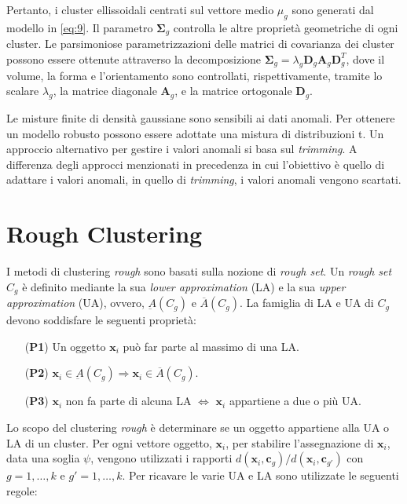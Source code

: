 \documentclass[12pt]{article}
\begin{document}
Pertanto, i cluster ellissoidali centrati sul vettore medio $\mu_g$ sono generati dal modello in \eqref{eq:9}. Il parametro $\boldsymbol{\Sigma}_g$ controlla le altre proprietà geometriche di ogni cluster. Le parsimoniose parametrizzazioni delle matrici di covarianza dei cluster possono essere ottenute attraverso la decomposizione $\boldsymbol{\Sigma}_g = \lambda_g \mathbf{D}_g \mathbf{A}_g \mathbf{D}_g^T$, dove il volume, la forma e l'orientamento sono controllati, rispettivamente, tramite lo scalare $\lambda_g$, la matrice diagonale $\mathbf{A}_g$, e la matrice ortogonale $\mathbf{D}_g$.

Le misture finite di densità gaussiane sono sensibili ai dati anomali. Per ottenere un modello robusto possono essere adottate una mistura di distribuzioni t. Un approccio alternativo per gestire i valori anomali si basa sul \textit{trimming}. A differenza degli approcci menzionati in precedenza in cui l'obiettivo è quello di adattare i valori anomali, in quello di \textit{trimming}, i valori anomali vengono scartati.

\section{Rough Clustering}

I metodi di clustering \textit{rough} sono basati sulla nozione di \textit{rough set}. Un \textit{rough set} $C_g$ è definito mediante la sua \textit{lower approximation} (LA) e la sua \textit{upper approximation} (UA), ovvero, $\underbar{A}(C_g)$ e $\overline{A}(C_g)$. La famiglia di LA e UA di $C_g$ devono soddisfare le seguenti proprietà:

\begin{itemize}
	\item[(\textbf{P1})] Un oggetto $\mathbf{x}_i$ può far parte al massimo di una LA.
	
	\item[(\textbf{P2})] $\mathbf{x}_i \in \underbar{A}(C_g) \Rightarrow \mathbf{x}_i \in \overline{A}(C_g)$.
	
	\item[(\textbf{P3})] $\mathbf{x}_i$ non fa parte di alcuna LA $\Leftrightarrow$ $\mathbf{x}_i$ appartiene a due o più UA.
\end{itemize}

Lo scopo del clustering \textit{rough} è determinare se un oggetto appartiene alla UA o LA di un cluster. Per ogni vettore oggetto, $\mathbf{x}_i$, per stabilire l'assegnazione di $\mathbf{x}_i$, data una soglia $\psi$, vengono utilizzati i rapporti $d(\mathbf{x}_i, \mathbf{c}_g)/d(\mathbf{x}_i, \mathbf{c}_{g'})$ con $g = 1, \dots, k$ e $g' = 1, \dots, k$. Per ricavare le varie UA e LA sono utilizzate le seguenti regole:
\end{document}
